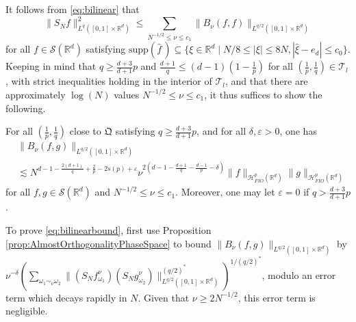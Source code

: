 \documentclass{amsart}
\numberwithin{equation}{section}
\theoremstyle{definition}
\newcommand{\R}{\mathbb{R}}
\newcommand{\Rd}{\mathbb{R}^{d}}
\newcommand{\Rn}{\mathbb{R}^{d}}
\newcommand {\Hp}{\mathcal{H}^{p}_{FIO}(\R^d)}
\newcommand {\veps}{\varepsilon}
\newcommand {\Sw}{\mathcal{S}}
\newcommand {\supp}{\mathrm{supp}}
\newcommand {\w}{\omega}
\newcommand {\wh}{\widehat}
\begin{document}
It follows from \eqref{eq:bilinear} that 
\[
\|S_{N}f\|_{L^{q}([0,1]\times\Rd)}^{2}\leq %
\sum_{N^{-1/2}\leq \nu\leq c_{1}}\|B_{\nu}(f,f)\|_{L^{q/2}([0,1]\times\Rd)}
\]
for all $f\in\Sw(\Rd)$ satisfying $\supp(\wh{f}\,)\subseteq \{\xi\in\Rn\mid N/8\leq |\xi|\leq 8N, |\hat{\xi}-e_{d}|\leq c_{0}\}$. Keeping in mind that $q\geq \frac{d+3}{d+1}p$ and $\frac{d+1}{q}\leq (d-1)(1-\frac{1}{p})$ for all $(\frac{1}{p},\frac{1}{q})\in\mathcal{T}_{l}$, with strict inequalities holding in the interior of $\mathcal{T}_{l}$, and that there are approximately $\log(N)$ values $N^{-1/2}\leq \nu\leq c_{1}$, it thus suffices to show the following. 

For all $(\frac{1}{p},\frac{1}{q})$ close to $\mathfrak{Q}$ satisfying $q\geq \frac{d+3}{d+1}p$, and for all $\delta,\veps>0$, one has
\begin{equation}\label{eq:bilinearbound}
\begin{aligned} 
&\|B_{\nu}(f,g)\|_{L^{q/2}([0,1]\times\Rd)}\\
&\lesssim N^{d-1-\frac{2(d+1)}{q}+\frac{2}{p}-2s(p)+\veps}\nu^{2(d-1-\frac{d+1}{q}-\frac{d-1}{p}-\delta)}\|f\|_{\Hp}\|g\|_{\Hp}
\end{aligned}
\end{equation}
for all $f,g\in\Sw(\Rd)$ and $N^{-1/2}\leq \nu\leq c_{1}$. Moreover, one may let $\veps=0$ if $q> \frac{d+3}{d+1}p$. 

To prove \eqref{eq:bilinearbound}, first use Proposition \ref{prop:AlmostOrthogonalityPhaseSpace} to bound $\|B_{\nu}(f,g)\|_{L^{q/2}([0,1]\times\Rd)}$ by $\nu^{-\delta}(\sum_{\w_{1}\sim_{\nu}\w_{2}}\|(S_{N}f^{\nu}_{\w_{1}})(S_{N}g^{\nu}_{\w_{2}})\|_{L^{q/2}([0,1]\times\Rd)}^{(q/2)^{*}})^{1/(q/2)^{*}}$, modulo an error term which decays rapidly in $N$. Given that $\nu\geq 2N^{-1/2}$, this error term is negligible. %
\end{document}

